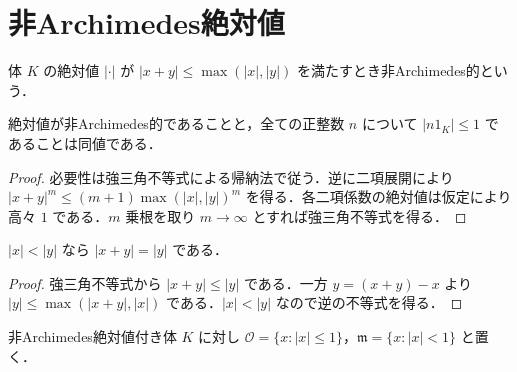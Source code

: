 \section{非Archimedes絶対値}
\begin{defn}[非Archimedes絶対値]
体 $K$ の絶対値 $|\cdot|$ が $|x+y|\leq\max(|x|,|y|)$ を満たすとき非Archimedes的という．
\end{defn}
\begin{prop}[整数倍による判定]
絶対値が非Archimedes的であることと，全ての正整数 $n$ について $|n1_K|\leq1$ であることは同値である．
\end{prop}
\begin{proof}
必要性は強三角不等式による帰納法で従う．逆に二項展開により $|x+y|^m\leq(m+1)\max(|x|,|y|)^m$ を得る．各二項係数の絶対値は仮定により高々 $1$ である．$m$ 乗根を取り $m\to\infty$ とすれば強三角不等式を得る．
\end{proof}
\begin{prop}[異なる絶対値を持つ元の和]
$|x|<|y|$ なら $|x+y|=|y|$ である．
\end{prop}
\begin{proof}
強三角不等式から $|x+y|\leq |y|$ である．一方 $y=(x+y)-x$ より $|y|\leq\max(|x+y|,|x|)$ である．$|x|<|y|$ なので逆の不等式を得る．
\end{proof}
\begin{defn}[付値環とその極大イデアル]
非Archimedes絶対値付き体 $K$ に対し $\mathcal O=\{x:|x|\leq1\}$，$\mathfrak m=\{x:|x|<1\}$ と置く．
\end{defn}

